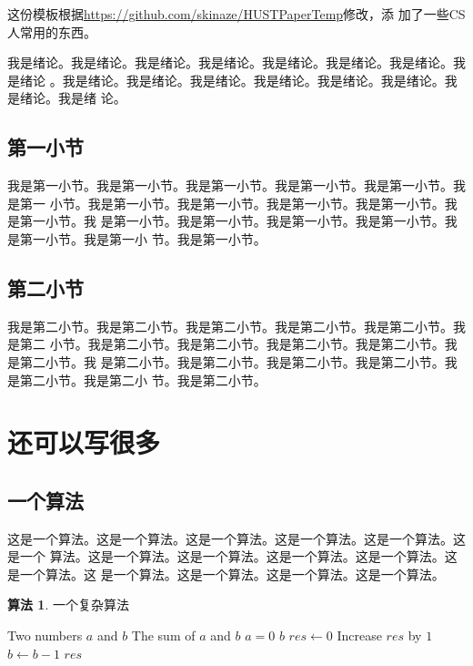 \documentclass[supercite]{HustGraduPaper}
\theoremstyle{definition}
\newtheorem{alg}{算法}[section]
\begin{document}
这份模板根据\url{https://github.com/skinaze/HUSTPaperTemp}\cite{ski17}修改，添
加了一些CS人常用的东西。

我是绪论。我是绪论。我是绪论。我是绪论。我是绪论。我是绪论。我是绪论。我是绪论
。我是绪论。我是绪论。我是绪论。我是绪论。我是绪论。我是绪论。我是绪论。我是绪
论。

\subsection{第一小节}

我是第一小节。我是第一小节。我是第一小节。我是第一小节。我是第一小节。我是第一
小节。我是第一小节。我是第一小节。我是第一小节。我是第一小节。我是第一小节。我
是第一小节。我是第一小节。我是第一小节。我是第一小节。我是第一小节。我是第一小
节。我是第一小节。

\subsection{第二小节}

我是第二小节。我是第二小节。我是第二小节。我是第二小节。我是第二小节。我是第二
小节。我是第二小节。我是第二小节。我是第二小节。我是第二小节。我是第二小节。我
是第二小节。我是第二小节。我是第二小节。我是第二小节。我是第二小节。我是第二小
节。我是第二小节。

\section{还可以写很多}

\subsection{一个算法}

这是一个算法。这是一个算法。这是一个算法。这是一个算法。这是一个算法。这是一个
算法。这是一个算法。这是一个算法。这是一个算法。这是一个算法。这是一个算法。这
是一个算法。这是一个算法。这是一个算法。这是一个算法。

\begin{shaded*}\begin{alg}{一个复杂算法}
  \label{alg:apb}
  \begin{algorithmic}
    \Input Two numbers $a$ and $b$
    \Output The sum of $a$ and $b$
      \If $a = 0$
        \State \Return $b$
      \EndIf
      \State $res \gets 0$
        \State Increase $res$ by $1$
        \State $b \gets b - 1$
      \EndWhile
      \State \Return $res$
    \EndProcedure
  \end{algorithmic}
\end{alg}\end{shaded*}
\end{document}
